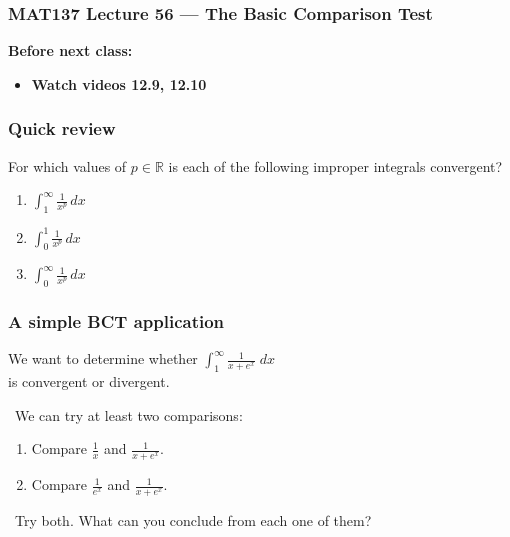 \documentclass[14pt]{beamer}
\newcommand{\R}{\mathbb{R}}
\newcommand{\setsize}[1]{\fontsize{#1}{#1}\selectfont} %
\newcommand{\smallerfont}{\setsize{13}} %
\begin{document}
\begin{frame}
	\frametitle{MAT137 Lecture 56 --- The Basic Comparison Test}

	\vfill
	{\bf Before next class:}
		\begin{itemize} \normalsize
			\item {\bf Watch videos 12.9, 12.10 }
		\end{itemize}
\end{frame}

	\begin{frame}[t]
		\frametitle{Quick review}

		For which values of ${\displaystyle p \in \R}$ is each of the following
		improper integrals convergent?

		\begin{enumerate}
			\item ${\displaystyle \int_1^{\infty} \frac{1}{x^{p}} \, dx }$

				\vfill

			\item ${\displaystyle \int_0^1 \frac{1}{x^{p}} \, dx }$

				\vfill

			\item ${\displaystyle \int_0^{\infty} \frac{1}{x^{p}} \, dx }$
		\end{enumerate}
	\end{frame}

	\begin{frame}[t]
		\smallerfont
		\frametitle{A simple BCT application}

		We want to determine whether
		${\displaystyle \int_1^{\infty} \frac{1}{x+e^{x}} \; dx}$ \\ is convergent
		or divergent.

		\
 We can try at least two comparisons:

		\begin{enumerate}
			\item Compare ${\displaystyle \frac{1}{x}}$ and ${\displaystyle \frac{1}{x+ e^{x}}}$.

			\item Compare ${\displaystyle \frac{1}{e^{x}}}$ and ${\displaystyle \frac{1}{x+ e^{x}}}$.
		\end{enumerate}

		\
 Try both. What can you conclude from each one of them?
	\end{frame}
\end{document}
